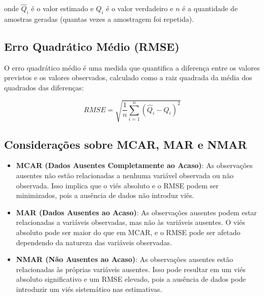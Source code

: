 \documentclass[11pt]{article}
\begin{document}
onde $\hat{Q}_i$ é o valor estimado e $Q_i$ é o valor verdadeiro e $n$ é a quantidade de amostras geradas (quantas vezes a amostragem foi repetida).

\subsection*{Erro Quadrático Médio (RMSE)}
O erro quadrático médio é uma medida que quantifica a diferença entre os valores previstos e os valores observados, calculado como a raiz quadrada da média dos quadrados das diferenças:

$$
RMSE = \sqrt{\frac{1}{n} \sum_{i=1}^{n} (\hat{Q}_i - Q_i)^2}
$$

\subsection*{Considerações sobre MCAR, MAR e NMAR}
\begin{itemize}
  \item \textbf{MCAR (Dados Ausentes Completamente ao Acaso)}: As observações ausentes não estão relacionadas a nenhuma variável observada ou não observada. Isso implica que o viés absoluto e o RMSE podem ser minimizados, pois a ausência de dados não introduz viés.
  \item \textbf{MAR (Dados Ausentes ao Acaso)}: As observações ausentes podem estar relacionadas a variáveis observadas, mas não às variáveis ausentes. O viés absoluto pode ser maior do que em MCAR, e o RMSE pode ser afetado dependendo da natureza das variáveis observadas.
  \item \textbf{NMAR (Não Ausentes ao Acaso)}: As observações ausentes estão relacionadas às próprias variáveis ausentes. Isso pode resultar em um viés absoluto significativo e um RMSE elevado, pois a ausência de dados pode introduzir um viés sistemático nas estimativas.
\end{itemize}
\end{document}
